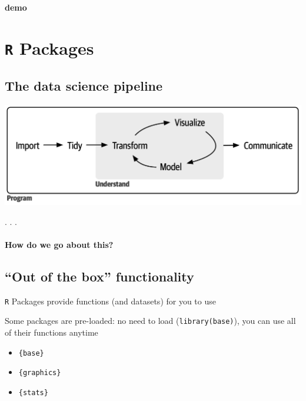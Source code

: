 \documentclass[
  letterpaper,
  DIV=11,
  numbers=noendperiod,
  oneside]{scrartcl}
\let\oldparagraph\paragraph
\renewcommand{\paragraph}[1]{\oldparagraph{#1}\mbox{}}
\providecommand{\tightlist}{%
  \setlength{\itemsep}{0pt}\setlength{\parskip}{0pt}}\usepackage{longtable,booktabs,array}
\begin{document}
{\textbf{demo}}

\hypertarget{r-packages}{%
\section{\texorpdfstring{\texttt{R}
Packages}{R Packages}}\label{r-packages}}

\hypertarget{the-data-science-pipeline}{%
\subsection{The data science pipeline}\label{the-data-science-pipeline}}

\includegraphics{w1_intro_files/mediabag/base.png}


. . .

\hypertarget{how-do-we-go-about-this}{%
\paragraph{How do we go about this?}\label{how-do-we-go-about-this}}

\hypertarget{out-of-the-box-functionality}{%
\subsection{``Out of the box''
functionality}\label{out-of-the-box-functionality}}

\texttt{R} Packages provide functions (and datasets) for you to use

Some packages are pre-loaded: no need to load (\texttt{library(base)}),
you can use all of their functions anytime

\begin{itemize}
\tightlist
\item
  \texttt{\{base\}}
\item
  \texttt{\{graphics\}}
\item
  \texttt{\{stats\}}
\end{itemize}
\end{document}
